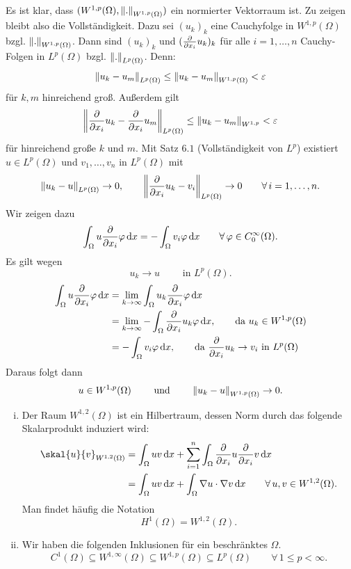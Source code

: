 \begin{beweis}
	Es ist klar, dass $(W^{1,p}(\Omega), \norm{.}_{W^{1,p}(\Omega)})$ ein normierter Vektorraum ist. Zu zeigen bleibt also die Vollständigkeit. Dazu sei $(u_k)_k$ eine 
	Cauchyfolge in $W^{1,p}(\Omega)$ bzgl. $\norm{.}_{W^{1,p}(\Omega)}$. Dann sind $(u_k)_k$ und $(\frac{{\partial }}{{\partial x_i}} u_k)_k$ für alle $i=1,\dots,n$ Cauchy-Folgen in $L^p(\Omega)$ bzgl. $\norm{.}_{L^p(\Omega)}$. Denn:
	\begin{align*}
		\norm{u_k-u_m}_{L^p(\Omega)} \leq  \norm{u_k-u_m}_{W^{1,p}(\Omega)} < \varepsilon
	\end{align*}
	für $k,m$ hinreichend groß. Außerdem gilt
	\[
		\norm{\diff{}{x_i}u_k- \diff{}{x_i}u_m}_{L^p(\Omega)} \leq \norm{u_k - u_m}_{W^{1,p}} < \varepsilon
	\]
	für hinreichend große $k$ und $m$. Mit Satz $6.1$ (Vollständigkeit von $L^p$) existiert $u \in L^p(\Omega)$ und $v_1, \dots , v_n$ in $L^p(\Omega)$ mit
	\[
		\norm{u_k-u}_{L^p(\Omega)} \to 0, \qquad \norm{\diff{}{x_i}u_k-v_i}_{L^p(\Omega)} \to 0 \qquad \forall\, i=1,\dots,n.
	\]
	Wir zeigen dazu
	\[
		\int_{\Omega}^{} u \frac{{\partial }}{{\partial x_i}} \varphi \,\mathrm{d}x = - \int_{\Omega}^{}v_i \varphi \,\mathrm{d}x \qquad \forall\, \varphi \in C^{\infty}_0(\Omega).
	\]
	Es gilt wegen
	\[
		u_k \to u \qquad \text{ in }L^p(\Omega).
	\]
	\begin{align*}
		\int_{\Omega}^{} u \frac{{\partial }}{{\partial x_i}} \varphi \,\mathrm{d}x &= \lim_{k \to \infty} \int_{\Omega}^{}u_k \frac{{\partial }}{{\partial x_i}} \varphi \,\mathrm{d}x \\
		&= \lim_{k \to \infty} - \int_{\Omega}^{} \frac{{\partial }}{{\partial x_i}} u_k \varphi \,\mathrm{d}x , \qquad \text{da }u_k \in W^{1,p}(\Omega) \\
		&= - \int_{\Omega}^{}v_i \varphi \,\mathrm{d}x, \qquad \text{da }\frac{{\partial }}{{\partial x_i}} u_k \to v_i \text{ in } L^p(\Omega)
	\end{align*}
	Daraus folgt dann
	\[
		u \in W^{1,p}(\Omega) \qquad \text{ und } \qquad \norm{u_k-u}_{W^{1,p}(\Omega)} \to 0.
	\]
\end{beweis}
\begin{bemerkung}
	\begin{enumerate}[(i)]
		\item Der Raum $W^{1,2}(\Omega)$ ist ein Hilbertraum, dessen Norm durch das folgende Skalarprodukt induziert wird:
		\begin{align*}
			\skal{u}{v}_{W^{1,2}(\Omega)} &= \int_{\Omega}^{}u v \,\mathrm{d}x + \sum^{n}_{i=1} \int_{\Omega}^{} \diff{}{x_i} u \diff{}{x_i}v \,\mathrm{d}x \\
			&= \int_{\Omega}^{} uv \,\mathrm{d}x+ \int_{\Omega}^{}  \nabla u \cdot  \nabla v \,\mathrm{d}x \qquad \forall\, u,v \in W^{1,2}(\Omega).
		\end{align*}
		Man findet häufig die Notation 
		\[
			H^1(\Omega) = W^{1,2}(\Omega).
		\]
		\item Wir haben die folgenden Inklusionen für ein beschränktes $\Omega$.
		\[
			C^1(\Omega) \subseteq W^{1,\infty}(\Omega) \subseteq  W^{1,p}(\Omega) \subseteq L^p(\Omega) \qquad \forall\, 1 \leq p <\infty.
		\]
	\end{enumerate}
\end{bemerkung}
